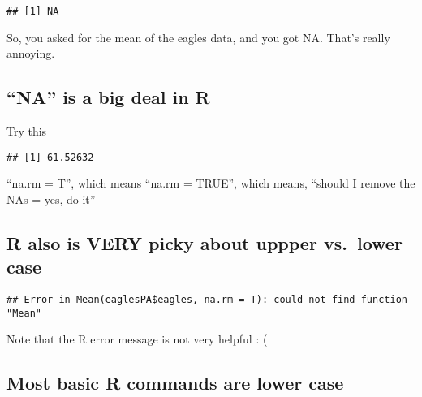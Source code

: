 \documentclass[
]{book}
\newenvironment{Shaded}{\begin{snugshade}}{\end{snugshade}}
\newcommand{\AttributeTok}[1]{\textcolor[rgb]{0.77,0.63,0.00}{#1}}
\newcommand{\FunctionTok}[1]{\textcolor[rgb]{0.00,0.00,0.00}{#1}}
\newcommand{\NormalTok}[1]{#1}
\newcommand{\SpecialCharTok}[1]{\textcolor[rgb]{0.00,0.00,0.00}{#1}}
\begin{document}
\begin{verbatim}
## [1] NA
\end{verbatim}

So, you asked for the mean of the eagles data, and you got NA. That's really annoying.

\hypertarget{na-is-a-big-deal-in-r}{%
\subsection{``NA'' is a big deal in R}\label{na-is-a-big-deal-in-r}}

Try this

\begin{Shaded}
\end{Shaded}

\begin{verbatim}
## [1] 61.52632
\end{verbatim}

``na.rm = T'', which means ``na.rm = TRUE'', which means, ``should I remove the NAs = yes, do it''

\hypertarget{r-also-is-very-picky-about-uppper-vs.-lower-case}{%
\subsection{R also is VERY picky about uppper vs.~lower case}\label{r-also-is-very-picky-about-uppper-vs.-lower-case}}

\begin{Shaded}
\end{Shaded}

\begin{verbatim}
## Error in Mean(eaglesPA$eagles, na.rm = T): could not find function "Mean"
\end{verbatim}

Note that the R error message is not very helpful : (

\hypertarget{most-basic-r-commands-are-lower-case}{%
\subsection{Most basic R commands are lower case}\label{most-basic-r-commands-are-lower-case}}
\end{document}
